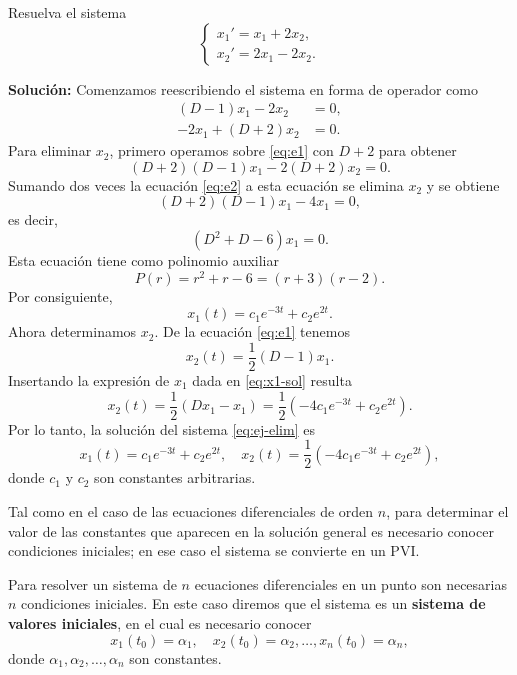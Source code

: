 \begin{example}
Resuelva el sistema
\begin{equation}\label{eq:ej-elim}
\begin{cases}
x_1' = x_1 + 2x_2, \\
x_2' = 2x_1 - 2x_2.
\end{cases}
\end{equation}

\textbf{Soluci\'on:} Comenzamos reescribiendo el sistema en forma de operador como
\begin{align}
(D - 1)x_1 - 2x_2 &= 0, \label{eq:e1}\\
-2x_1 + (D + 2)x_2 &= 0. \label{eq:e2}
\end{align}
Para eliminar $x_2$, primero operamos sobre \eqref{eq:e1} con $D + 2$ para obtener
\[
(D + 2)(D - 1)x_1 - 2(D + 2)x_2 = 0.
\]
Sumando dos veces la ecuaci\'on \eqref{eq:e2} a esta ecuaci\'on se elimina $x_2$ y se obtiene
\[
(D + 2)(D - 1)x_1 - 4x_1 = 0,
\]
es decir,
\[
(D^2 + D - 6)x_1 = 0.
\]
Esta ecuaci\'on tiene como polinomio auxiliar
\[
P(r) = r^2 + r - 6 = (r + 3)(r - 2).
\]
Por consiguiente,
\begin{equation}\label{eq:x1-sol}
x_1(t) = c_1 e^{-3t} + c_2 e^{2t}.
\end{equation}
Ahora determinamos $x_2$. De la ecuaci\'on \eqref{eq:e1} tenemos
\[
x_2(t) = \frac{1}{2}(D - 1)x_1.
\]
Insertando la expresi\'on de $x_1$ dada en \eqref{eq:x1-sol} resulta
\[
x_2(t) = \frac{1}{2}(Dx_1 - x_1) = \frac{1}{2}(-4c_1e^{-3t} + c_2e^{2t}).
\]
Por lo tanto, la soluci\'on del sistema \eqref{eq:ej-elim} es
\[
x_1(t) = c_1e^{-3t} + c_2e^{2t}, \quad x_2(t) = \frac{1}{2}(-4c_1e^{-3t} + c_2e^{2t}),
\]
donde $c_1$ y $c_2$ son constantes arbitrarias.
\end{example}

Tal como en el caso de las ecuaciones diferenciales de orden $n$, para determinar el valor de las constantes que aparecen en la soluci\'on general es necesario conocer condiciones iniciales; en ese caso el sistema se convierte en un PVI.

\begin{definition}
Para resolver un sistema de $n$ ecuaciones diferenciales en un punto son necesarias $n$ condiciones iniciales. En este caso diremos que el sistema es un \textbf{sistema de valores iniciales}, en el cual es necesario conocer
\[
x_1(t_0)=\alpha_1,\quad x_2(t_0)=\alpha_2,\dots,x_n(t_0)=\alpha_n,
\]
donde $\alpha_1,\alpha_2,\dots,\alpha_n$ son constantes.
\end{definition}

